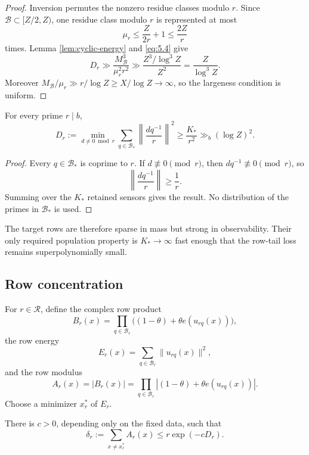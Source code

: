 \begin{proof}
Inversion permutes the nonzero residue classes modulo $r$. Since $\mathcal B\subset[Z/2,Z)$, one residue class modulo $r$ is represented at most
\[
\mu_r\le\frac{Z}{2r}+1\le\frac{2Z}{r}
\]
times. Lemma \ref{lem:cyclic-energy} and \eqref{eq:5.4} give
\[
D_r
\gg
\frac{M_{\mathcal B}^3}{\mu_r^2r^2}
\gg
\frac{Z^3/\log^3Z}{Z^2}
=
\frac{Z}{\log^3Z}.
\]
Moreover $M_{\mathcal B}/\mu_r\gg r/\log Z\ge X/\log Z\to\infty$, so the largeness condition is uniform.
\end{proof}

\begin{proposition}\label{prop:target-row-distance}
For every prime $r\mid b$,
\[
D_r:=
\min_{d\ne0\bmod r}
\sum_{q\in\mathcal B_*}
\left\|\frac{dq^{-1}}r\right\|^2
\ge\frac{K_*}{r^2}
\gg_b(\log Z)^2.
\tag{5.6}\label{eq:5.6}
\]
\end{proposition}

\begin{proof}
Every $q\in\mathcal B_*$ is coprime to $r$. If $d\not\equiv0\pmod r$, then $dq^{-1}\not\equiv0\pmod r$, so
\[
\left\|\frac{dq^{-1}}r\right\|\ge\frac1r.
\]
Summing over the $K_*$ retained sensors gives the result. No distribution of the primes in $\mathcal B_*$ is used.
\end{proof}

The target rows are therefore sparse in mass but strong in observability. Their only required population property is $K_*\to\infty$ fast enough that the row-tail loss remains superpolynomially small.

\subsection{Row concentration}

For $r\in\mathcal R$, define the complex row product
\[
B_r(x)
=
\prod_{q\in\mathcal B_r}
\bigl((1-\theta)+\theta e(u_{rq}(x))\bigr),
\]
the row energy
\[
E_r(x)=
\sum_{q\in\mathcal B_r}\|u_{rq}(x)\|^2,
\tag{5.7}\label{eq:5.7}
\]
and the row modulus
\[
A_r(x)=|B_r(x)|
=
\prod_{q\in\mathcal B_r}
\left|(1-\theta)+\theta e(u_{rq}(x))\right|.
\tag{5.8}\label{eq:5.8}
\]
Choose a minimizer $x_r^*$ of $E_r$.

\begin{lemma}\label{lem:row-tail}
There is $c>0$, depending only on the fixed data, such that
\[
\delta_r:=
\sum_{x\ne x_r^*}A_r(x)
\le
r\exp(-cD_r).
\tag{5.9}\label{eq:5.9}
\]
\end{lemma}

